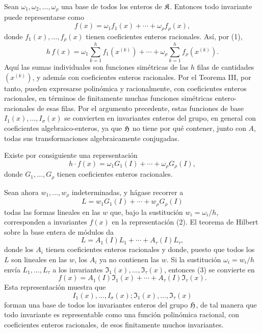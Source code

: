 \documentclass[11pt]{article}
\begin{document}
Sean \(\omega_1,\omega_2,\ldots,\omega_\rho\) una base de todos los enteros de \(\mathfrak K\). Entonces todo invariante puede representarse como
\[
        f(x)=\omega_1 f_1(x)+\cdots+\omega_\rho f_\rho(x),
\]
donde \(f_1(x),\ldots,f_\rho(x)\) tienen coeficientes enteros racionales. Así, por (1),
\[
        h\,f(x)
        =
        \omega_1\sum_{k=1}^{h}f_1(x^{(k)})
        +\cdots+
        \omega_\rho\sum_{k=1}^{h}f_\rho(x^{(k)}).
\]
Aquí las sumas individuales son funciones simétricas de las \(h\) filas de cantidades \((x^{(k)})\), y además con coeficientes enteros racionales. Por el Teorema III, por tanto, pueden expresarse polinómica y racionalmente, con coeficientes enteros racionales, en términos de finitamente muchas funciones simétricas entero-racionales de esas filas. Por el argumento precedente, estas funciones de base \(I_1(x),\ldots,I_\sigma(x)\) se convierten en invariantes enteros del grupo, en general con coeficientes algebraico-enteros, ya que \(\mathfrak H\) no tiene por qué contener, junto con \(A\), todas sus transformaciones algebraicamente conjugadas.

Existe por consiguiente una representación
\begin{equation}
        h\cdot f(x)=\omega_1G_1(I)+\cdots+\omega_\rho G_\rho(I),
\end{equation}
donde \(G_1,\ldots,G_\rho\) tienen coeficientes enteros racionales.

Sean ahora \(w_1,\ldots,w_\rho\) indeterminadas, y hágase recorrer a
\[
        L=w_1G_1(I)+\cdots+w_\rho G_\rho(I)
\]
todas las formas lineales en las \(w\) que, bajo la sustitución \(w_i=\omega_i/h\), corresponden a invariantes \(f(x)\) en la representación (2). El teorema de Hilbert sobre la base entera de módulos da
\begin{equation}
        L=A_1(I)L_1+\cdots+A_\tau(I)L_\tau,
\end{equation}
donde los \(A_i\) tienen coeficientes enteros racionales y donde, puesto que todos los \(L\) son lineales en las \(w\), los \(A_i\) ya no contienen las \(w\). Si la sustitución \(\omega_i=w_i/h\) envía \(L_1,\ldots,L_\tau\) a los invariantes \(\mathfrak I_1(x),\ldots,\mathfrak I_\tau(x)\), entonces (3) se convierte en
\begin{equation}
        f(x)=A_1(I)\mathfrak I_1(x)+\cdots+A_\tau(I)\mathfrak I_\tau(x).
\end{equation}
Esta representación muestra que
\[
        I_1(x),\ldots,I_\sigma(x);\mathfrak I_1(x),\ldots,\mathfrak I_\tau(x)
\]
forman una base de todos los invariantes enteros del grupo \(\mathfrak H\), de tal manera que todo invariante es representable como una función polinómica racional, con coeficientes enteros racionales, de esos finitamente muchos invariantes.
\end{document}
